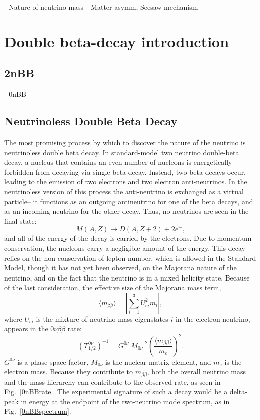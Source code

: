 	- Nature of neutrino mass
	- Matter asymm, Seesaw mechanism

\section{Double beta-decay introduction}
\subsection{2nBB}
- 0nBB
	
\subsection{Neutrinoless Double Beta Decay}
The most promising process by which to discover the nature of the neutrino is neutrinoless double beta decay. In standard-model two neutrino double-beta decay, a nucleus that contains an even number of nucleons is energetically forbidden from decaying via single beta-decay. Instead, two beta decays occur, leading to the emission of two electrons and two electron anti-neutrinos. In the neutrinoless version of this process the anti-neutrino is exchanged as a virtual particle-- it functions as an outgoing antineutrino for one of the beta decays, and as an incoming neutrino for the other decay. Thus, no neutrinos are seen in the final state:
$$M(A, Z) \rightarrow D(A, Z+2) + 2 e^{-},$$
 and all of the energy of the decay is carried by the electrons. Due to momentum conservation, the nucleons carry a negligible amount of the energy. This decay relies on the non-conservation of lepton number, which is allowed in the Standard Model, though it has not yet been observed, on the Majorana nature of the neutrino, and on the fact that the neutrino is in a mixed helicity state. Because of the last consideration, the effective size of the Majorana mass term, 
 $$\langle m_{\beta\beta} \rangle = |\sum\limits_{i=1}^3 U^2_{ei}m_i|,$$
 where $U_{ei}$ is the mixture of neutrino mass eigenstates $i$ in the electron neutrino, appears in the $0\nu\beta\beta$ rate:
 $$(T_{1/2}^{0\nu})^{-1} = G^{0\nu}|M_{0\nu}|^{2}\left(\frac{\langle m_{\beta\beta} \rangle}{m_e}\right)^2 .$$
 $G^{0\nu}$ is a phase space factor, $M_{0\nu}$ is the nuclear matrix element, and $m_e$ is the electron mass. Because they contribute to $m_{\beta\beta}$, both the overall neutrino mass and the mass hierarchy can contribute to the observed rate, as seen in Fig.~\ref{0nBBrate}. The experimental signature of such a decay would be a delta-peak in energy at the endpoint of the two-neutrino mode spectrum, as in Fig.~\ref{0nBBspectrum}.
 
